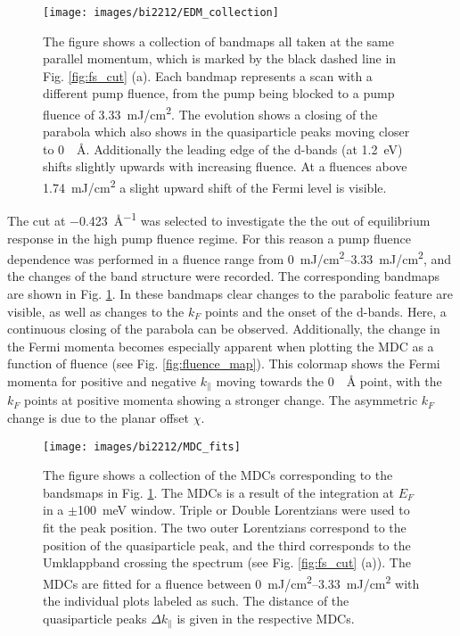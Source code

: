 \begin{figure}[th!]
	\centering
	\texttt{[image: images/bi2212/EDM\_collection]}
	\caption{The figure shows a collection of bandmaps all taken at the same parallel momentum, which is marked by the black dashed line in Fig. \ref{fig:fs_cut} (a). Each bandmap represents a scan with a different pump fluence, from the pump being blocked to a pump fluence of \qty{3.33}{\milli\joule/\centi\meter\squared}. The evolution shows a closing of the parabola which also shows in the quasiparticle peaks moving closer to \qty{0}{\per\angstrom}. Additionally the leading edge of the  d-bands (at \qty{1.2}{\electronvolt}) shifts slightly upwards with increasing fluence. At a fluences above \qty{1.74}{\milli\joule/\centi\meter\squared} a slight upward shift of the Fermi level is visible.}
	\label{fig:edm_collection}
\end{figure}

The cut at \qty{-0.423}{\angstrom^{-1}} was selected to investigate the the out of equilibrium response in the high pump fluence regime.
For this reason a pump fluence dependence was performed in a fluence range from \qtyrange{0}{3.33}{\milli\joule/\centi\meter\squared}, and the changes of the band structure were recorded.
The corresponding bandmaps are shown in Fig. \ref{fig:edm_collection}.
In these bandmaps clear changes to the parabolic feature are visible, as well as changes to the $k_F$ points and the onset of the  d-bands.
Here, a continuous closing of the parabola can be observed.
Additionally, the change in the Fermi momenta becomes especially apparent when plotting the MDC as a function of fluence (see Fig. \ref{fig:fluence_map}).
This colormap shows the Fermi momenta for positive and negative $k_\parallel$ moving towards the \qty{0}{\per\angstrom} point, with the $k_F$ points at positive momenta showing a stronger change.
The asymmetric $k_F$ change is due to the planar offset $\chi$.

\begin{figure}[t]
	\centering
	\texttt{[image: images/bi2212/MDC\_fits]}
	\caption{The figure shows a collection of the MDCs corresponding to the bandsmaps in Fig. \ref{fig:edm_collection}. The MDCs is a result of the integration at $E_F$ in a $\pm$\qty{100}{\milli\electronvolt} window. Triple or Double Lorentzians were used to fit the peak position. The two outer Lorentzians correspond to the position of the quasiparticle peak, and the third corresponds to the Umklappband crossing the spectrum (see Fig. \ref{fig:fs_cut} (a)). The MDCs are fitted for a fluence between \qtyrange{0}{3.33}{\milli\joule/\centi\meter\squared} with the individual plots labeled as such. The distance of the quasiparticle peaks $\Delta k_\parallel$ is given in the respective MDCs.}
	\label{fig:mdc_fits}
\end{figure}

